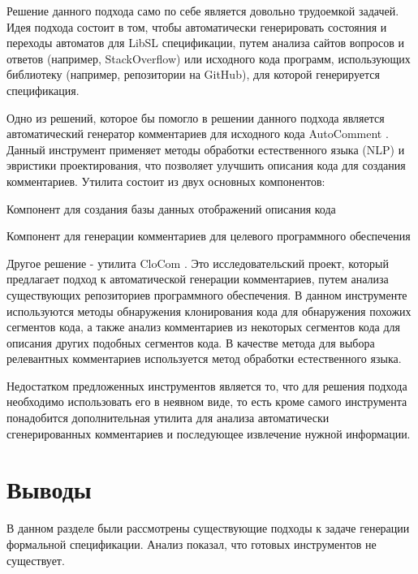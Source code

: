 Решение данного подхода само по себе является довольно трудоемкой задачей. Идея подхода состоит в том, чтобы автоматически генерировать  состояния и переходы автоматов для LibSL спецификации, путем анализа сайтов вопросов и ответов (например, StackOverflow) или исходного кода программ, использующих библиотеку (например, репозитории на GitHub), для которой генерируется спецификация.

Одно из решений, которое бы помогло в решении данного подхода является автоматический генератор комментариев для исходного кода AutoComment \cite{AutoComment}.
Данный инструмент применяет методы обработки естественного языка (NLP) и эвристики проектирования, что позволяет улучшить описания кода для создания комментариев.
Утилита состоит из двух основных компонентов:
%
\begin{itemize*}
\item Компонент для создания базы данных отображений описания кода
\item Компонент для генерации комментариев для целевого программного обеспечения
\end{itemize*}
%

Другое решение - утилита CloCom . Это исследовательский проект, который предлагает подход к автоматической генерации комментариев, путем анализа существующих репозиториев программного обеспечения.
В данном инструменте используются методы обнаружения клонирования кода для обнаружения похожих сегментов кода, а также анализ комментариев из некоторых сегментов кода для описания других подобных сегментов кода.
В качестве метода для выбора релевантных комментариев используется метод обработки естественного языка.

Недостатком предложенных инструментов является то, что для решения подхода необходимо использовать его в неявном виде, то есть кроме самого инструмента понадобится дополнительная утилита для анализа автоматически сгенерированных комментариев и последующее извлечение нужной информации.


\section{Выводы}

В данном разделе были рассмотрены существующие подходы к задаче генерации формальной спецификации.
Анализ показал, что готовых инструментов не существует.